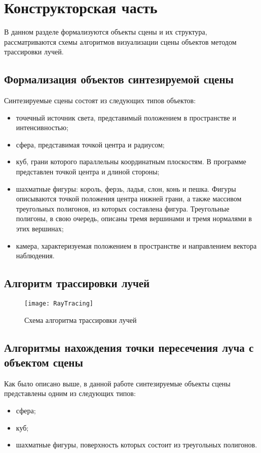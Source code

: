 \chapter{Конструкторская часть}
В данном разделе формализуются объекты сцены и их структура, рассматриваются схемы алгоритмов визуализации сцены объектов методом трассировки лучей.

\section{Формализация объектов синтезируемой сцены}
Синтезируемые сцены состоят из следующих типов объектов:
\begin{itemize}
	\item точечный источник света, представимый положением в пространстве и интенсивностью;
	\item сфера, представимая точкой центра и радиусом;
	\item куб, грани которого параллельны координатным плоскостям. В программе представлен точкой центра и длиной стороны;
	\item шахматные фигуры: король, ферзь, ладья, слон, конь и пешка. Фигуры описываются точкой положения центра нижней грани, а также массивом треугольных полигонов, из которых составлена фигура. Треугольные полигоны, в свою очередь, описаны тремя вершинами и тремя нормалями в этих вершинах;
	\item камера, характеризуемая положением в пространстве и направлением вектора наблюдения.
\end{itemize}

\section{Алгоритм трассировки лучей}
\begin{figure}[H]
	\centering
	\texttt{[image: RayTracing]}
	\caption{Схема алгоритма трассировки лучей}
	\label{fig:RayTracing}
\end{figure}

\section{Алгоритмы нахождения точки пересечения луча с объектом сцены}
Как было описано выше, в данной работе синтезируемые объекты сцены представлены одним из следующих типов:
\begin{itemize}
	\item сфера;
	\item куб;
	\item шахматные фигуры, поверхность которых состоит из треугольных полигонов.
\end{itemize}

